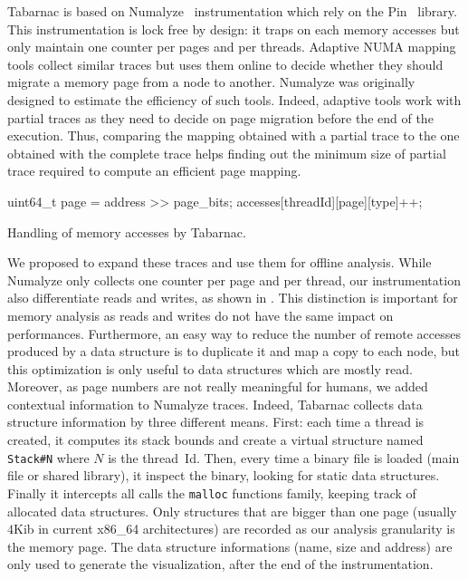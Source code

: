 \gls{Tabarnac} is based on \gls{Numalyze}~\cite{Diener15Characterizing} instrumentation which rely on the \gls{Pin}~\cite{Luk05Pin} library.
This instrumentation is lock free by design: it traps on each memory accesses but only maintain one counter per pages and per threads.
Adaptive \gls{NUMA} mapping tools collect similar traces but uses them online to decide whether they should migrate a memory page from a node to another.
\gls{Numalyze} was originally designed to estimate the efficiency of such tools.
Indeed, adaptive tools work with partial traces as they need to decide on page migration before the end of the execution.
Thus, comparing the mapping obtained with a partial trace to the one obtained with the complete trace helps finding out the minimum size of partial trace required to compute an efficient page mapping.

\begin{algorithm}[htb]
    \begin{algorithmic}
            \State uint64\_t page = address >> page\_bits;
            \State accesses[threadId][page][type]++;
        \EndFunction
    \end{algorithmic}
    \caption{Handling of memory accesses by Tabarnac.}
    \label{alg:Tabarnac}
\end{algorithm}

We proposed to expand these traces and use them for offline analysis.
While \gls{Numalyze} only collects one counter per page and per thread, our instrumentation also differentiate reads and writes, as shown in .
This distinction is important for memory analysis as reads and writes do not have the same impact on performances.
Furthermore, an easy way to reduce the number of remote accesses produced by a data structure is to duplicate it and map a copy to each node, but this optimization is only useful to data structures which are mostly read.
Moreover, as page numbers are not really meaningful for humans, we added contextual information to \gls{Numalyze} traces.
Indeed, \gls{Tabarnac} collects data structure information by three different means.
First: each time a thread is created, it computes its stack bounds and create a virtual structure named \texttt{Stack\#N} where $N$ is the thread~Id.
Then, every time a binary file is loaded (main file or shared library), it inspect the binary, looking for static data structures.
Finally it intercepts all calls the \texttt{malloc} functions family, keeping track of allocated data structures.
Only structures that are bigger than one page (usually $4$Kib in current x86\_64 architectures) are recorded as our analysis granularity is the memory page.
The data structure informations (name, size and address) are only used to generate the visualization, after the end of the instrumentation.

